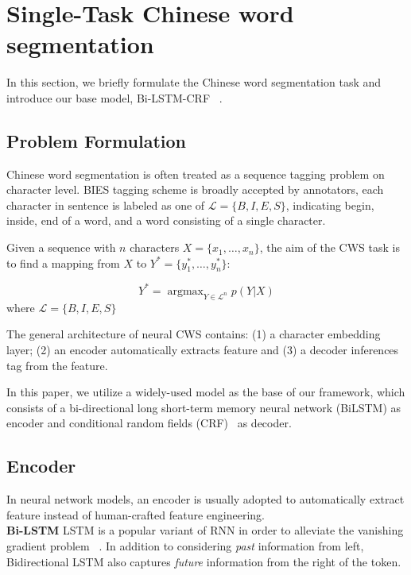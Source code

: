 \section{Single-Task Chinese word segmentation}\label{sec:single-task}

In this section, we briefly formulate the Chinese word segmentation task and introduce our base model, Bi-LSTM-CRF ~\cite{DBLP:journals/corr/HuangXY15}.

\subsection{Problem Formulation}

Chinese word segmentation is often treated as a sequence tagging problem on character level. BIES tagging scheme is broadly accepted by annotators, each character in sentence is labeled as one of $\mathcal{L} = \{B, I, E, S\}$, indicating begin, inside, end of a word, and a word consisting of a single character. 

Given a sequence with $n$ characters $X = \{x_1, \ldots, x_n \}$, the aim of the CWS task is to find a mapping from $X$ to $Y^\ast = \{y_1^\ast, \ldots, y_n^\ast\}$:

\small
\begin{equation} \label{eq:1}
Y^\ast = \mathop{\arg\max}_{Y \in \mathcal{L}^n} p(Y | X)
\end{equation}
\normalsize
where $\mathcal{L} = \{B, I, E, S\}$

The general architecture of neural CWS contains: (1) a character embedding layer; (2) an encoder automatically extracts feature and (3) a decoder inferences tag from the feature.

In this paper, we utilize a widely-used model as the base of our framework, 
which consists of a bi-directional long short-term memory neural network 
(BiLSTM) as encoder and conditional random fields (CRF)~\cite{lafferty2001conditional} as decoder.

\subsection{Encoder}

In neural network models, an encoder is usually adopted to automatically extract feature instead of human-crafted feature engineering.\\

\noindent \textbf{Bi-LSTM} \quad LSTM is a popular variant of RNN in order to alleviate the vanishing gradient problem ~\cite{Bengio:1994:LLD:2325857.2328340,Hochreiter:1997}. In addition to considering \textit{past} information from left, Bidirectional LSTM also captures \textit{future} information from the right of the token.


